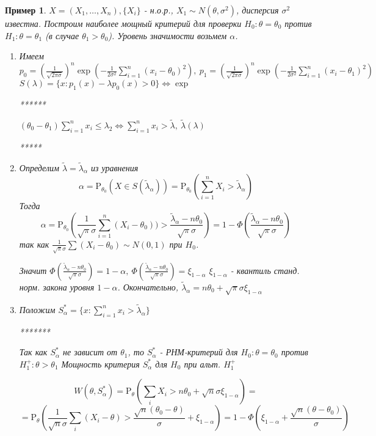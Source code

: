 \documentclass[12pt]{article}
\theoremstyle{theorem}
\newtheorem{example}{Пример}
\def\P{
    \mathrm{P}
}
\begin{document}
\begin{example}
    $X = (X_1,\ldots, X_n), \{X_i\}$ - н.о.р., $X_1 \sim N(\theta, \sigma^2)$,
    дисперсия $\sigma^2$ известна. Построим наиболее мощный критерий
    для проверки $H_0: \theta = \theta_0$ против $H_1: \theta = \theta_1$
    (в случае $\theta_1 > \theta_0$). Уровень значимости возьмем $\alpha$.
    \begin{enumerate}
        \item Имеем $p_0 = \left(\frac{1}{\sqrt{2\pi\sigma}}\right)^n \exp{(-\frac{1}{2\sigma^2} \sum^n_{i=1} (x_i -\theta_0)^2)},\ 
        p_1 = \left(\frac{1}{\sqrt{2\pi\sigma}}\right)^n \exp{(-\frac{1}{2\sigma^2} \sum^n_{i=1} (x_i -\theta_1)^2)}$
        $S(\lambda) = \{x:p_1(x) - \lambda p_0(x) > 0\} \Leftrightarrow \exp{}$

        ******

        $(\theta_0 - \theta_1)\sum_{i=1}^n x_i \leq \lambda_2 \Leftrightarrow
        \sum_{i=1}^n x_i > \widetilde{\lambda},\ \widetilde{\lambda}(\lambda) $
        
        *****

        \item Определим $\widetilde{\lambda} = \widetilde{\lambda}_\alpha$ 
            из уравнения
            $$\alpha = \P_{\theta_0}(X \in S(\widetilde{\lambda}_\alpha)) = 
            \P_{\theta_0}(\sum_{i=1}^n X_i > \widetilde{\lambda}_\alpha)$$
            Тогда
            $$\alpha = \P_{\theta_0}\left(\frac{1}{\sqrt{\pi} \sigma} \sum_{i=1}^n(X_i - \theta_0)) > \frac{\widetilde{\lambda}_\alpha - n\theta_0}{\sqrt{\pi}\sigma}\right)=
            1 - \Phi(\frac{\widetilde{\lambda}_\alpha - n\theta_0}{\sqrt{\pi}\sigma})$$
            так как $\frac{1}{\sqrt{\pi}\sigma}\sum (X_i - \theta_0) \sim N(0, 1)$ при $H_0$.
            
            Значит $\Phi(\frac{\widetilde{\lambda}_\alpha - n\theta_0}{\sqrt{\pi}\sigma}) = 1 - \alpha,\
            \Phi(\frac{\widetilde{\lambda}_\alpha - n\theta_0}{\sqrt{\pi}\sigma}) = \xi_{1-\alpha}$
            $\xi_{1 - \alpha}$ - квантиль станд. норм. закона уровня $1 - \alpha$.
            Окончательно, $\widetilde{\lambda}_\alpha = n\theta_0 + \sqrt{\pi}\sigma \xi_{1-\alpha}$
        \item Положим $S^*_{\alpha} = \{x: \sum_{i=1}^n x_i > \widetilde{\lambda}_\alpha\}$
        
        *******

        Так как $S^*_{\alpha}$ не зависит от $\theta_1$,
        то $S^*_{\alpha}$ - РНМ-критерий для $H_0: \theta = \theta_0$
        против $H^+_1 : \theta > \theta_1$
        Мощность критерия $S^*_{\alpha}$ для $H_0$ при альт. $H^+_1$

        $$W(\theta, S^*_{\alpha}) = \P_\theta\left(\sum_iX_i > n\theta_0 + \sqrt{n}\sigma\xi_{1-\alpha}\right) = $$
        $$ = \P_\theta\left(\frac{1}{\sqrt{n}\sigma} \sum_i(X_i - \theta) > \frac{\sqrt{n}(\theta_0 - \theta)}{\sigma} + \xi_{1-\alpha}\right) =
        1 - \Phi\left(\xi_{1-\alpha} + \frac{\sqrt{n}(\theta - \theta_0)}{\sigma}\right)$$
    \end{enumerate} 
\end{example}
\end{document}
